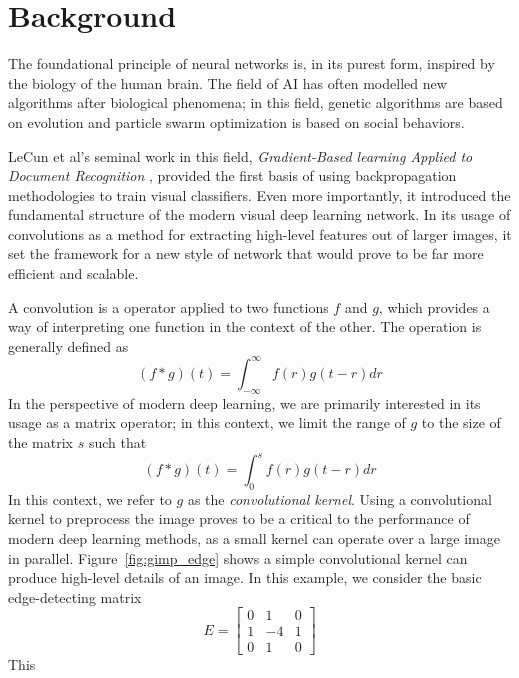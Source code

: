 \chapter{Background}

The foundational principle of neural networks is, in its purest form, inspired by the biology of the human brain.
The field of AI has often modelled new algorithms after biological phenomena; in this field, genetic algorithms are based on evolution and particle swarm optimization is based on social behaviors.


LeCun et al's seminal work in this field, \emph{Gradient-Based learning Applied to Document Recognition} \cite{lecun1998gradient}, provided the first basis of using backpropagation methodologies to train visual classifiers.
Even more importantly, it introduced the fundamental structure of the modern visual deep learning network.
In its usage of convolutions as a method for extracting high-level features out of larger images, it set the framework for a new style of network that would prove to be far more efficient and scalable.

A convolution is a operator applied to two functions $f$ and $g$, which provides a way of interpreting one function in the context of the other.
The operation is generally defined as
\[(f * g)(t) = \int_{-\infty}^\infty f(r)g(t-r) dr\]
In the perspective of modern deep learning, we are primarily interested in its usage as a matrix operator; in this context, we limit the range of $g$ to the size of the matrix $s$ such that
\[(f * g)(t) = \int_0^s f(r)g(t-r) dr\]
In this context, we refer to $g$ as the \emph{convolutional kernel}.
Using a convolutional kernel to preprocess the image proves to be a critical to the performance of modern deep learning methods, as a small kernel can operate over a large image in parallel.
Figure~\ref{fig:gimp_edge} shows a simple convolutional kernel can produce high-level details of an image.
In this example, we consider the basic edge-detecting matrix 
\[E = \begin{bmatrix}
    0 & 1  & 0 \\ 
    1 & -4 & 1 \\ 
    0 & 1  & 0
    \end{bmatrix}\]
This 


